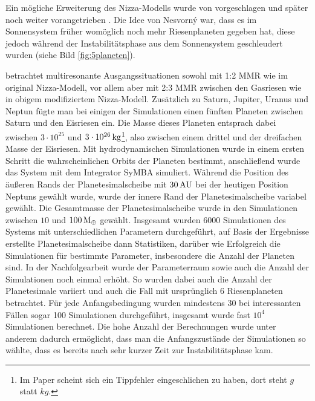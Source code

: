 \documentclass[12pt,a4paper,twoside]{article}
\renewcommand{\cite}{\citep}
\newcommand{\ME}{M_\oplus}
\begin{document}
Ein mögliche Erweiterung des Nizza-Modells wurde von \cite{Nesvorny2011} vorgeschlagen und später noch weiter vorangetrieben \cite{Nesvorny2012}. Die Idee von Nesvorný war, dass es im Sonnensystem früher womöglich noch mehr Riesenplaneten gegeben hat, diese jedoch während der Instabilitätsphase aus dem Sonnensystem geschleudert wurden (siehe Bild \ref{fig:5planeten}).

\cite{Nesvorny2011} betrachtet multiresonante Ausgangssituationen sowohl mit 1:2 MMR wie im original Nizza-Modell, vor allem aber mit 2:3 MMR zwischen den Gasriesen wie in obigem modifiziertem Nizza-Modell.
Zusätzlich zu Saturn, Jupiter, Uranus und Neptun fügte man bei einigen der Simulationen einen fünften Planeten zwischen Saturn und den Eisriesen ein. Die Masse dieses Planeten entsprach dabei zwischen $3\cdot10^{25}$ und $\unit[3\cdot10^{26}]{kg}$\footnote{Im Paper \cite{Nesvorny2011} scheint sich ein Tippfehler eingeschlichen zu haben, dort steht $\unit{g}$ statt $\unit{kg}$.}, also zwischen einem drittel und der dreifachen Masse der Eisriesen.
Mit hydrodynamischen Simulationen wurde in einem ersten Schritt die wahrscheinlichen Orbits der Planeten bestimmt, anschließend wurde das System mit dem Integrator SyMBA simuliert.
Während die Position des äußeren Rands der Planetesimalscheibe mit $\unit[30]{AU}$ bei der heutigen Position Neptuns gewählt wurde, wurde der innere Rand der Planetesimalscheibe variabel gewählt.
Die Gesamtmasse der Planetesimalscheibe wurde in den Simulationen zwischen $10$ und $\unit[100]{\ME}$ gewählt.
Insgesamt wurden 6000 Simulationen des Systems mit unterschiedlichen Parametern durchgeführt, auf Basis der Ergebnisse erstellte Planetesimalscheibe dann Statistiken, darüber wie Erfolgreich die Simulationen für bestimmte Parameter, insbesondere die Anzahl der Planeten sind.
In der Nachfolgearbeit \cite{Nesvorny2012} wurde der Parameterraum sowie auch die Anzahl der Simulationen noch einmal erhöht. So wurden dabei auch die Anzahl der Planetesimale variiert und auch die Fall mit ursprünglich 6 Riesenplaneten betrachtet. Für jede Anfangsbedingung wurden mindestens 30 bei interessanten Fällen sogar 100 Simulationen durchgeführt, insgesamt wurde fast $10^4$ Simulationen berechnet. Die hohe Anzahl der Berechnungen wurde unter anderem dadurch ermöglicht, dass man die Anfangszustände der Simulationen so wählte, dass es bereits nach sehr kurzer Zeit zur Instabilitätsphase kam.
\end{document}
